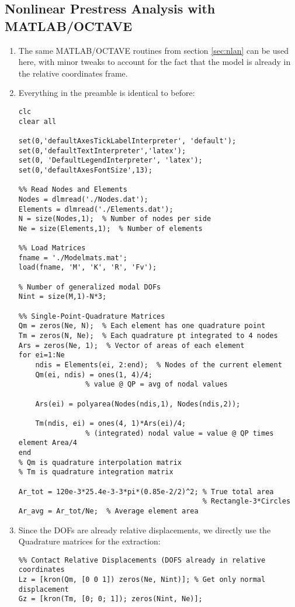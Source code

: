 \documentclass[11pt]{article}
\begin{document}
\subsection{Nonlinear Prestress Analysis with MATLAB/OCTAVE}
\label{sec:orgcd714a7}
\begin{enumerate}
\item The same MATLAB/OCTAVE routines from section \ref{sec:nlan} can be used here, with minor tweaks to account for the fact that the model is already in the relative coordinates frame.
\item Everything in the preamble is identical to before:
\begin{verbatim}
clc
clear all

set(0,'defaultAxesTickLabelInterpreter', 'default');
set(0,'defaultTextInterpreter','latex');
set(0, 'DefaultLegendInterpreter', 'latex');
set(0,'defaultAxesFontSize',13);

%% Read Nodes and Elements
Nodes = dlmread('./Nodes.dat');
Elements = dlmread('./Elements.dat');
N = size(Nodes,1);  % Number of nodes per side
Ne = size(Elements,1);  % Number of elements

%% Load Matrices
fname = './Modelmats.mat';
load(fname, 'M', 'K', 'R', 'Fv');

% Number of generalized modal DOFs
Nint = size(M,1)-N*3;

%% Single-Point-Quadrature Matrices
Qm = zeros(Ne, N);  % Each element has one quadrature point
Tm = zeros(N, Ne);  % Each quadrature pt integrated to 4 nodes
Ars = zeros(Ne, 1);  % Vector of areas of each element
for ei=1:Ne
    ndis = Elements(ei, 2:end);  % Nodes of the current element
    Qm(ei, ndis) = ones(1, 4)/4;
                % value @ QP = avg of nodal values

    Ars(ei) = polyarea(Nodes(ndis,1), Nodes(ndis,2));

    Tm(ndis, ei) = ones(4, 1)*Ars(ei)/4;
                % (integrated) nodal value = value @ QP times element Area/4
end
% Qm is quadrature interpolation matrix
% Tm is quadrature integration matrix

Ar_tot = 120e-3*25.4e-3-3*pi*(0.85e-2/2)^2; % True total area
                                            % Rectangle-3*Circles
Ar_avg = Ar_tot/Ne;  % Average element area
\end{verbatim}
\item Since the DOFs are already relative displacements, we directly use the Quadrature matrices for the extraction:
\begin{verbatim}
%% Contact Relative Displacements (DOFS already in relative coordinates
Lz = [kron(Qm, [0 0 1]) zeros(Ne, Nint)]; % Get only normal displacement
Gz = [kron(Tm, [0; 0; 1]); zeros(Nint, Ne)];


\end{verbatim}
\end{enumerate}
\end{document}
